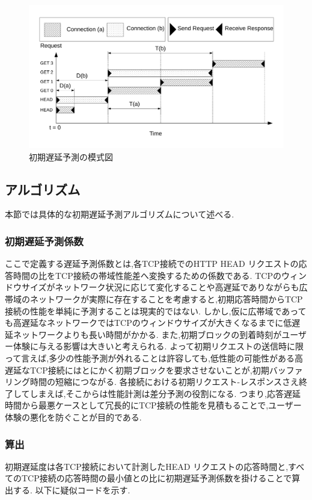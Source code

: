 \documentclass[a4j,12pt]{gradthesis_utf8}
\begin{document}
\begin{figure}[ht]
	\centering
	\includegraphics[width=14cm]{figure/head.pdf}
	\caption{初期遅延予測の模式図}
	\label{head}
\end{figure}

\newpage

\subsection{アルゴリズム}
\label{yosokuhouhou}
本節では具体的な初期遅延予測アルゴリズムについて述べる.

\subsubsection{初期遅延予測係数}
ここで定義する遅延予測係数とは,各TCP接続でのHTTP HEAD リクエストの応答時間の比をTCP接続の帯域性能差へ変換するための係数である.
TCPのウィンドウサイズがネットワーク状況に応じて変化することや高遅延でありながらも広帯域のネットワークが実際に存在することを考慮すると,初期応答時間からTCP接続の性能を単純に予測することは現実的ではない.
しかし,仮に広帯域であっても高遅延なネットワークではTCPのウィンドウサイズが大きくなるまでに低遅延ネットワークよりも長い時間がかかる.
また,初期ブロックの到着時刻がユーザー体験に与える影響は大きいと考えられる.
よって初期リクエストの送信時に限って言えば,多少の性能予測が外れることは許容しても,低性能の可能性がある高遅延なTCP接続にはとにかく初期ブロックを要求させないことが,初期バッファリング時間の短縮につながる.
各接続における初期リクエスト-レスポンスさえ終了してしまえば,そこからは性能計測は差分予測の役割になる.
つまり,応答遅延時間から最悪ケースとして冗長的にTCP接続の性能を見積もることで,ユーザー体験の悪化を防ぐことが目的である.

\subsubsection{算出}
初期遅延度は各TCP接続において計測したHEAD リクエストの応答時間と,すべてのTCP接続の応答時間の最小値との比に初期遅延予測係数を掛けることで算出する.
以下に疑似コードを示す.
\end{document}
